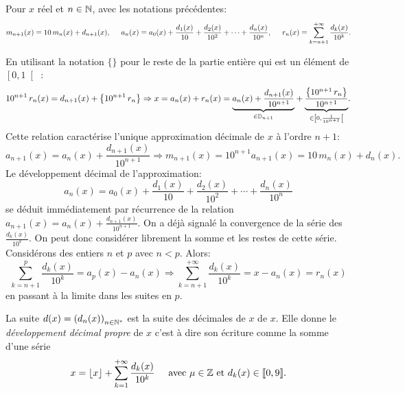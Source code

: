 \begin{propn} \label{devdec}
 Pour $x$ réel et $n\in \mathbb{N}$, avec les notations précédentes:
\[
 m_{n+1}(x) = 10\,m_n(x) + d_{n+1}(x),\hspace{0.5cm}
 a_n(x) = a_0(x) + \frac{d_1(x)}{10} + \frac{d_2(x)}{10^2} + \cdots + \frac{d_n(x)}{10^n},\hspace{0.5cm}
 r_n(x) = \sum_{k = n+1}^{+\infty} \frac{d_k(x)}{10^k}.
\]
\end{propn}
\begin{demo}
En utilisant la notation $\{ \}$ pour le reste de la partie entière qui est un élément de $\left[ 0,1\right[$ :
\[
 10^{n+1}\, r_n(x) = d_{n+1}(x) + \left\lbrace 10^{n+1}\, r_n\right\rbrace 
 \Rightarrow 
 x = a_n(x) + r_n(x) 
 = \underset{ \in \mathbb{D}_{n+1}}{\underbrace{a_n(x) + \frac{d_{n+1}(x)}{10^{n+1}}}} 
 + \underset{\in \left[ 0,\frac{1}{10^{n+1}}\right[ }{\underbrace{\frac{\left\lbrace 10^{n+1}\, r_n\right\rbrace}{10^{n+1}}}}. 
\]
Cette relation caractérise l'unique approximation décimale de $x$ à l'ordre $n+1$:
\[
 a_{n+1}(x) = a_n(x) + \frac{d_{n+1}(x)}{10^{n+1}}
 \Rightarrow
 m_{n+1}(x) = 10^{n+1}a_{n+1}(x) = 10\, m_n(x) + d_n(x).
\]
Le développement décimal de l'approximation:
\[
 a_n(x) = a_0(x) + \frac{d_1(x)}{10} + \frac{d_2(x)}{10^2} + \cdots + \frac{d_n(x)}{10^n}
\]
se déduit immédiatement par récurrence de la relation $a_{n+1}(x) = a_n(x) + \frac{d_{n+1}(x)}{10^{n+1}}$.\newline
On a déjà signalé la convergence de la série des $\frac{d_k(x)}{10^{k}}$. On peut donc considérer librement la somme et les restes de cette série. Considérons des entiers $n$ et $p$ avec $n < p$. Alors:
\[
 \sum_{k=n+1}^{p}\frac{d_k(x)}{10^{k}} = a_p(x) - a_n(x)
 \Rightarrow
 \sum_{k=n+1}^{+ \infty}\frac{d_k(x)}{10^{k}} = x - a_n(x) = r_n(x)
\]
en passant à la limite dans les suites en $p$.
\end{demo}
\begin{defi}
La suite $d(x) = \left( d_n(x)\right)_{n\in \mathbb{N}^*}$ est la suite des décimales de $x$  de $x$. Elle donne le \emph{développement décimal propre} de $x$ c'est à dire son écriture comme la somme d'une série
\[
 x = \lfloor x \rfloor + \sum_{k=1}^{+\infty} \frac{d_k(x)}{10^k} \hspace{0.5cm} \text{avec } \mu \in \mathbb{Z} \text{ et } d_k(x) \in \llbracket 0,9 \rrbracket.
\] 
\end{defi}

